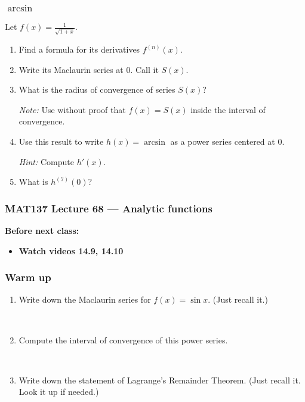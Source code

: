 \documentclass[14pt]{beamer}
\newcommand{\setsize}[1]{\fontsize{#1}{#1}\selectfont} %
\newcommand{\vvv}{\vspace{.2cm}}
\begin{document}
	\begin{frame}[t]
		\frametitle{$\arcsin$}

		Let ${\displaystyle f(x)=\frac{1}{\sqrt{1+x}}}$.
		\begin{enumerate}
			\item Find a formula for its derivatives ${\displaystyle f^{(n)}(x)}$.
				\vvv

			\item Write its Maclaurin series at $0$. Call it $S(x)$. \vvv

			\item What is the radius of convergence of series $S(x)$?

				{\setsize{12} \emph{Note:} Use without proof that ${\displaystyle f(x)=S(x)}$ inside the interval of convergence. }
				\vvv

			\item Use this result to write $h(x) = \arcsin$ as a power series centered
				at $0$.

				{\setsize{12} \emph{Hint:} Compute ${\displaystyle h'(x)}$. } \vvv

			\item What is ${\displaystyle h^{(7)}(0)}$?
		\end{enumerate}
	\end{frame}







\begin{frame}
	\frametitle{MAT137 Lecture 68 ---  	Analytic functions }

	\vfill
	{\bf Before next class:}
		\begin{itemize} \normalsize
			\item {\bf Watch videos 14.9, 14.10 }
		\end{itemize}
\end{frame}


	\begin{frame}[t]
		\frametitle{Warm up}

		\begin{enumerate}
			\item Write down the Maclaurin series for ${\displaystyle f(x)=\sin x}$. (Just
				recall it.)

				\


			\item Compute the interval of convergence of this power series.

				\

			\item Write down the statement of Lagrange's Remainder Theorem. (Just recall
				it. Look it up if needed.)
		\end{enumerate}
	\end{frame}
\end{document}
